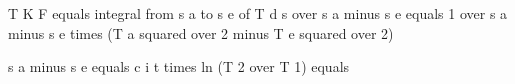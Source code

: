 T K F equals integral from s a to s e of T d s over s a minus s e equals 1 over s a minus s e times (T a squared over 2 minus T e squared over 2)

s a minus s e equals c i t times ln (T 2 over T 1) equals
